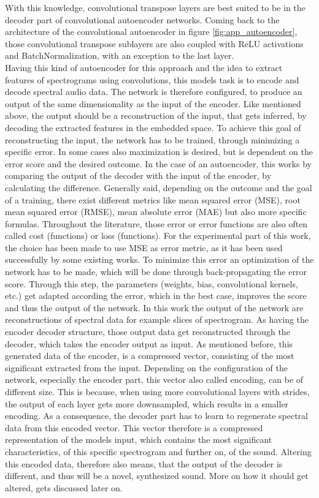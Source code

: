 With this knowledge, convolutional transpose layers are best suited to be in the decoder part of convolutional autoencoder networks. Coming back to the architecture of the convolutional autoencoder in figure \ref{fig:app_autoencoder}, those convolutional transpose sublayers are also coupled with ReLU activations and BatchNormalization, with an exception to the last layer.\\

Having this kind of autoencoder for this approach and the idea to extract features of spectrograms using convolutions, this models task is to encode and decode spectral audio data. The network is therefore configured, to produce an output of the same dimensionality as the input of the encoder. Like mentioned above, the output should be a reconstruction of the input, that gets inferred, by decoding the extracted features in the embedded space. To achieve this goal of reconstructing the input, the network has to be trained, through minimizing a specific error. In some cases also maximization is desired, but is dependent on the error score and the desired outcome. In the case of an autoencoder, this works by comparing the output of the decoder with the input of the encoder, by calculating the difference. Generally said, depending on the outcome and the goal of a training, there exist different metrics like mean squared error (MSE), root mean squared error (RMSE), mean absolute error (MAE) but also more specific formulas. Throughout the literature, those error or error functions are also often called cost (functions) or loss (functions). For the experimental part of this work, the choice has been made to use MSE as error metric, as it has been used successfully by some existing works. 
To minimize this error an optimization of the network has to be made, which will be done through back-propagating the error score. Through this step, the parameters (weights, bias, convolutional kernels, etc.) get adapted according the error, which in the best case, improves the score and thus the output of the network. In this work the output of the network are reconstructions of spectral data for example slices of spectrogram. As having the encoder decoder structure, those output data get reconstructed through the decoder, which takes the encoder output as input. As mentioned before, this generated data of the encoder, is a compressed vector, consisting of the most significant extracted from the input. Depending on the configuration of the network, especially the encoder part, this vector also called encoding, can be of different size. This is because, when using more convolutional layers with strides, the output of each layer gets more downsampled, which results in a smaller encoding. As a consequence, the decoder part has to learn to regenerate spectral data from this encoded vector. This vector therefore is a compressed representation of the models input, which contains the most significant characteristics, of this specific spectrogram and further on, of the sound. Altering this encoded data, therefore also means, that the output of the decoder is different, and thus will be a novel, synthesized sound. More on how it should get altered, gets discussed later on.
